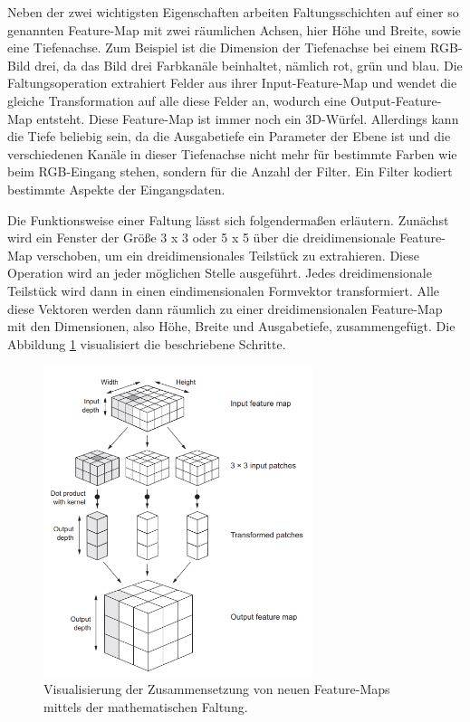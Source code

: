 Neben der zwei wichtigsten Eigenschaften arbeiten Faltungsschichten auf einer so genannten Feature-Map mit zwei räumlichen Achsen, hier Höhe und Breite, sowie eine Tiefenachse. Zum Beispiel ist die Dimension der Tiefenachse bei einem RGB-Bild drei, da das Bild drei Farbkanäle beinhaltet, nämlich rot, grün und blau. Die Faltungsoperation extrahiert Felder aus ihrer Input-Feature-Map und wendet die gleiche Transformation auf alle diese Felder an, wodurch eine Output-Feature-Map entsteht. Diese Feature-Map ist immer noch ein 3D-Würfel. Allerdings kann die Tiefe beliebig sein, da die Ausgabetiefe ein Parameter der Ebene ist und die verschiedenen Kanäle in dieser Tiefenachse nicht mehr für bestimmte Farben wie beim RGB-Eingang stehen, sondern für die Anzahl der Filter. Ein Filter kodiert bestimmte Aspekte der Eingangsdaten\cite{francois}. 

Die Funktionsweise einer Faltung lässt sich folgendermaßen erläutern\cite{francois}. Zunächst wird ein Fenster der Größe 3 x 3 oder 5 x 5 über die dreidimensionale Feature-Map verschoben, um ein dreidimensionales Teilstück zu extrahieren. Diese Operation wird an jeder möglichen Stelle ausgeführt. Jedes dreidimensionale Teilstück wird dann in einen eindimensionalen Formvektor transformiert. Alle diese Vektoren werden dann räumlich zu einer dreidimensionalen Feature-Map mit den Dimensionen, also Höhe, Breite und Ausgabetiefe, zusammengefügt. Die Abbildung \ref{feature_map_extraction} visualisiert die beschriebene Schritte.

\begin{figure}[h!]
	\centering
	\includegraphics[width=0.7\textwidth]{bilder/feature_map_extraction.PNG}
	\caption{Visualisierung der Zusammensetzung von neuen Feature-Maps mittels der mathematischen Faltung\cite{francois}.}
	\label{feature_map_extraction}
\end{figure}


